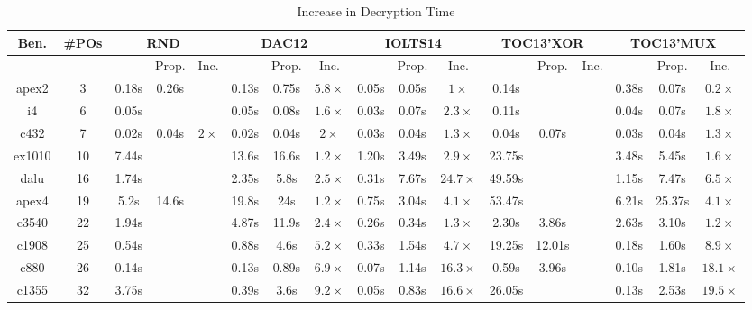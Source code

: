 \begin{table*}[!htbp]
\begin{center}
\caption{Increase in Decryption Time}
\label{tab:results-RT-proposed-eff}
\begin{tabular}{|c|c|c|c|c|c|c|c|c|c|c|c|c|c|c|c|c|}
\hline
Ben. & \#POs & \multicolumn{3}{c|}{RND~\cite{farinaz:epic}} & \multicolumn{3}{c|}{DAC12~\cite{jv:dac12}} & \multicolumn{3}{c|}{IOLTS14~\cite{dupuis:iolts14}} & \multicolumn{3}{c|}{TOC13'XOR~\cite{jv:tc15}} & \multicolumn{3}{c|}{TOC13'MUX~\cite{jv:tc15}} \\
\hline
	&    & ~\cite{dupuis:iolts14} & Prop. &Inc. & ~\cite{dupuis:iolts14} & Prop. &Inc. & ~\cite{dupuis:iolts14} & Prop. &Inc. & ~\cite{dupuis:iolts14} & Prop. &Inc. &~\cite{dupuis:iolts14} & Prop. &Inc. \\
\hline 
apex2   &3   &0.18s &0.26s &		&0.13s &0.75s &$5.8\times$		&0.05s &0.05s &$1 \times$ 		&0.14s & &			&0.38s &0.07s &$0.2 \times$ \\
\hline 
i4      &6	&0.05s & &		&0.05s &0.08s &$1.6\times$		&0.03s &0.07s &$2.3 \times$ 		&0.11s & &			&0.04s &0.07s &$1.8 \times$ \\
\hline 
c432    &7   &0.02s &0.04s &$2\times$	&0.02s &0.04s &$2\times$ 		&0.03s &0.04s &$1.3 \times$  		&0.04s &0.07s & 			&0.03s &0.04s &$1.3 \times$  \\
\hline 
ex1010  &10   	&7.44s & &		&13.6s &16.6s &$1.2\times$		&1.20s &3.49s &$2.9 \times$ 		&23.75s & &			&3.48s &5.45s &$1.6 \times$ \\
\hline 
dalu   &16    &1.74s & &		&2.35s &5.8s &$2.5\times$		&0.31s &7.67s &$24.7 \times$ 		&49.59s & &			&1.15s &7.47s &$6.5 \times$ \\
\hline 
apex4   &19   &5.2s &14.6s &		&19.8s &24s &$1.2\times$			&0.75s &3.04s &$4.1 \times$ 		&53.47s & &			&6.21s &25.37s &$4.1 \times$ \\
\hline 
c3540   &22   	&1.94s & &		&4.87s &11.9s &$2.4\times$		&0.26s &0.34s &$1.3 \times$ 		&2.30s &3.86s &			&2.63s &3.10s &$1.2 \times$ \\
\hline 
c1908   &25   &0.54s & &		&0.88s &4.6s &$5.2\times$		&0.33s &1.54s &$4.7 \times$ 		&19.25s &12.01s &			&0.18s &1.60s &$8.9 \times$ \\
\hline 
c880    &26    &0.14s	& &		&0.13s &0.89s &$6.9\times$		&0.07s &1.14s &$16.3 \times$ 		&0.59s &3.96s &			&0.10s &1.81s &$18.1 \times$ \\
\hline 
c1355    &32  	 &3.75s & &		&0.39s &3.6s &$9.2\times$		&0.05s &0.83s &$16.6 \times$ 		&26.05s & &			&0.13s &2.53s &$19.5 \times$ \\

\end{tabular}
\end{center}
\end{table*}
